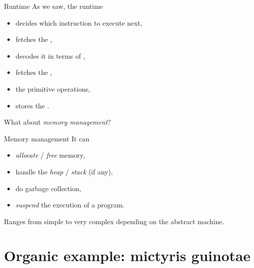 \documentclass[10pt]{beamer}
\begin{document}
\begin{frame}{Runtime}
  As we saw, the runtime
  \smallskip
  \begin{itemize}
  \item decides which instruction to execute next,
  \item fetches the ,
  \item decodes it in terms of ,
  \item fetches the ,
  \item {} the primitive operations,
  \item stores the .
  \end{itemize}

  \bigskip
  \pause

  What about \emph{memory management}?
\end{frame}




\begin{frame}{Memory management}
  It can
  \smallskip
  \begin{itemize}
  \item \emph{allocate} / \emph{free} memory,
  \item handle the \emph{heap} / \emph{stack} (if any),
  \item do garbage collection,
  \item \emph{suspend} the execution of a program.
  \end{itemize}

  \pause
  \bigskip

  Ranges from simple to very complex depending on the abstract machine.
\end{frame}




\section{Organic example: mictyris guinotae}
\end{document}
